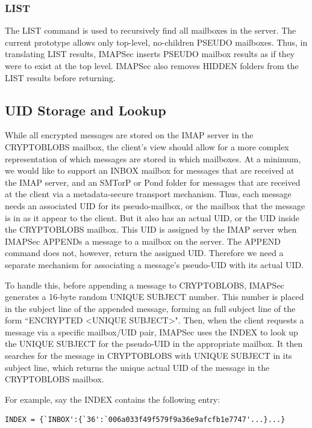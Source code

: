 \documentclass[pageno]{jpaper}
\newcommand{\project}{IMAPSec }
\begin{document}
\subsubsection{LIST} The LIST command is used to recursively find all mailboxes in the server. The current prototype allows only top-level, no-children PSEUDO mailboxes. Thus, in translating LIST results, \project inserts PSEUDO mailbox results as if they were to exist at the top level. \project also removes HIDDEN folders from the LIST results before returning.

\label{uid-translation}
\subsection{UID Storage and Lookup}
While all encrypted messages are stored on the IMAP server in the CRYPTOBLOBS mailbox, the client's view should allow for a more complex representation of which messages are stored in which mailboxes. At a minimum, we would like to support an INBOX mailbox for messages that are received at the IMAP server, and an SMTorP or Pond folder for messages that are received at the client via a metadata-secure transport mechanism. Thus, each message needs an associated UID for its pseudo-mailbox, or the mailbox that the message is in as it appear to the client. But it also has an actual UID, or the UID inside the CRYPTOBLOBS mailbox. This UID is assigned by the IMAP server when \project APPENDs a message to a mailbox on the server. The APPEND command does not, however, return the assigned UID. Therefore we need a separate mechanism for associating a message's pseudo-UID with its actual UID.

To handle this, before appending a message to CRYPTOBLOBS, \project generates a 16-byte random UNIQUE SUBJECT number. This number is placed in the subject line of the appended message, forming an full subject line of the form ``ENCRYPTED <UNIQUE SUBJECT>". Then, when the client requests a message via a specific mailbox/UID pair, \project uses the INDEX to look up the UNIQUE SUBJECT for the pseudo-UID in the appropriate mailbox. It then searches for the message in CRYPTOBLOBS with UNIQUE SUBJECT in its subject line, which returns the unique actual UID of the message in the CRYPTOBLOBS mailbox.

For example, say the INDEX contains the following entry:

\begin{lstlisting}
INDEX = {`INBOX':{`36':`006a033f49f579f9a36e9afcfb1e7747'...}...}
\end{lstlisting}
\end{document}
